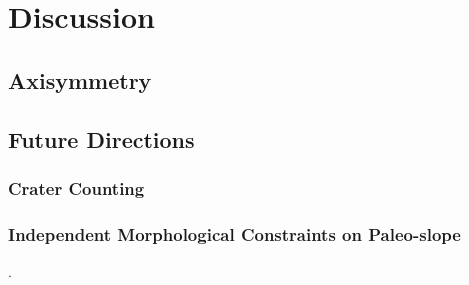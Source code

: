 \chapter{Discussion}

\section{Axisymmetry}

\section{Future Directions}
\subsection{Crater Counting}
\textcite{kneissl_map-projection-independent_2011,robbins_volcanic_2011,
robbins_large_2013,
platz_crater-based_2013}

\subsection{Independent Morphological Constraints on Paleo-slope}
\textcite{wadge_lobes_1991, peitersen_correlations_2000,peters_lava_2021}.